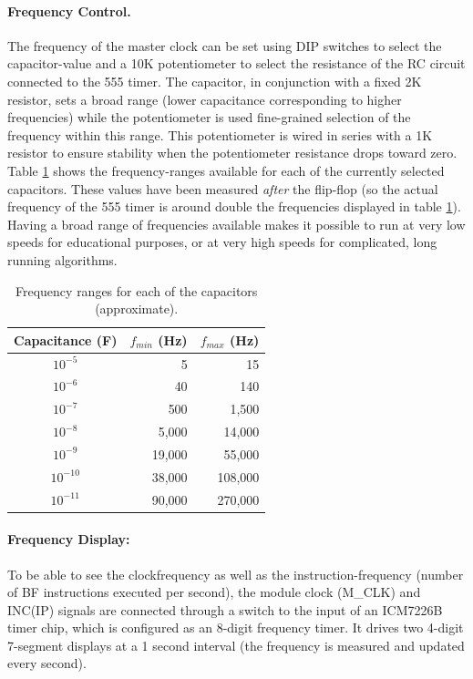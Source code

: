 \paragraph{Frequency Control.} The frequency of the master clock can be set using DIP switches to select the capacitor-value and a 10K potentiometer to select the resistance of the RC circuit connected to the 555 timer. The capacitor, in conjunction with a fixed 2K resistor, sets a broad range (lower capacitance corresponding to higher frequencies) while the potentiometer is used fine-grained selection of the frequency within this range. This potentiometer is wired in series with a 1K resistor to ensure stability when the potentiometer resistance drops toward zero. Table \ref{tab:frequencycontrol} shows the frequency-ranges available for each of the currently selected capacitors. These values have been measured \emph{after} the flip-flop (so the actual frequency of the 555 timer is around double the frequencies displayed in table \ref{tab:frequencycontrol}). Having a broad range of frequencies available makes it possible to run at very low speeds for educational purposes, or at very high speeds for complicated, long running algorithms.

\begin{table}
  \centering
  \begin{tabular}{c|r|r}
    Capacitance (F) & $f_{min}$ (Hz) & $f_{max}$ (Hz) \\ \hline
    $10^{-5}$  & 5 & 15 \\
    $10^{-6}$  & 40 & 140 \\
    $10^{-7}$  & 500 & 1,500 \\
    $10^{-8}$  & 5,000 & 14,000 \\
    $10^{-9}$  & 19,000 & 55,000 \\
    $10^{-10}$ & 38,000 & 108,000 \\
    $10^{-11}$ & 90,000 & 270,000 \\
  \end{tabular}
  \caption{Frequency ranges for each of the capacitors (approximate).}
  \label{tab:frequencycontrol}
\end{table}

\paragraph{Frequency Display:} To be able to see the clockfrequency as well as the instruction-frequency (number of BF instructions executed per second), the module clock (M\_CLK) and INC(IP) signals are connected through a switch to the input of an ICM7226B timer chip\cite{?}, which is configured as an 8-digit frequency timer. It drives two 4-digit 7-segment displays at a 1 second interval (the frequency is measured and updated every second). 

